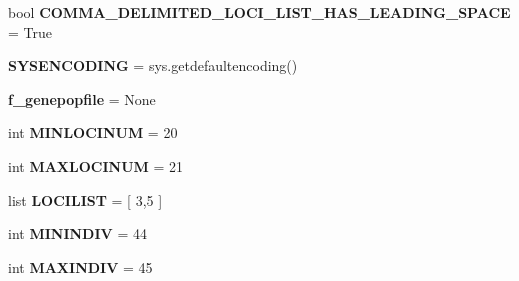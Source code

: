 \begin{DoxyCompactItemize}
\item 
bool {\bfseries C\+O\+M\+M\+A\+\_\+\+D\+E\+L\+I\+M\+I\+T\+E\+D\+\_\+\+L\+O\+C\+I\+\_\+\+L\+I\+S\+T\+\_\+\+H\+A\+S\+\_\+\+L\+E\+A\+D\+I\+N\+G\+\_\+\+S\+P\+A\+CE} = True\hypertarget{namespacenegui_1_1genepopfilemanager_af15ed21d14e5f584a874a0d10b10739d}{}\label{namespacenegui_1_1genepopfilemanager_af15ed21d14e5f584a874a0d10b10739d}

\item 
{\bfseries S\+Y\+S\+E\+N\+C\+O\+D\+I\+NG} = sys.\+getdefaultencoding()\hypertarget{namespacenegui_1_1genepopfilemanager_a3c3bbbfd67240bf77a2a8fbd5a9f3542}{}\label{namespacenegui_1_1genepopfilemanager_a3c3bbbfd67240bf77a2a8fbd5a9f3542}

\item 
{\bfseries f\+\_\+genepopfile} = None\hypertarget{namespacenegui_1_1genepopfilemanager_a7a2994efb3e240c270c2e7a62000f2c1}{}\label{namespacenegui_1_1genepopfilemanager_a7a2994efb3e240c270c2e7a62000f2c1}

\item 
int {\bfseries M\+I\+N\+L\+O\+C\+I\+N\+UM} = 20\hypertarget{namespacenegui_1_1genepopfilemanager_a032d36e3d59734eb290f56fbc9f4d998}{}\label{namespacenegui_1_1genepopfilemanager_a032d36e3d59734eb290f56fbc9f4d998}

\item 
int {\bfseries M\+A\+X\+L\+O\+C\+I\+N\+UM} = 21\hypertarget{namespacenegui_1_1genepopfilemanager_aea98f85aed04a4ff582c5d1eb32e02ef}{}\label{namespacenegui_1_1genepopfilemanager_aea98f85aed04a4ff582c5d1eb32e02ef}

\item 
list {\bfseries L\+O\+C\+I\+L\+I\+ST} = \mbox{[} 3,5 \mbox{]}\hypertarget{namespacenegui_1_1genepopfilemanager_a38e86480dd22ce099fec32442ea63ef7}{}\label{namespacenegui_1_1genepopfilemanager_a38e86480dd22ce099fec32442ea63ef7}

\item 
int {\bfseries M\+I\+N\+I\+N\+D\+IV} = 44\hypertarget{namespacenegui_1_1genepopfilemanager_a5cc728b26c596a476750244b7ad4a47a}{}\label{namespacenegui_1_1genepopfilemanager_a5cc728b26c596a476750244b7ad4a47a}

\item 
int {\bfseries M\+A\+X\+I\+N\+D\+IV} = 45\hypertarget{namespacenegui_1_1genepopfilemanager_a71de3daec99105f89311429f85d8bee7}{}\label{namespacenegui_1_1genepopfilemanager_a71de3daec99105f89311429f85d8bee7}


\end{DoxyCompactItemize}
